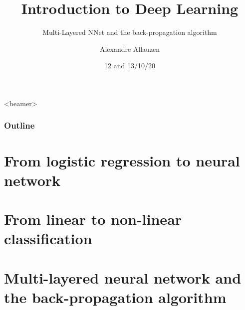 \documentclass[10pt]{beamer}
\title[IDL@BME-BIN] %
{Introduction to Deep Learning}
\subtitle{Multi-Layered NNet and the back-propagation algorithm}
\author[A. Allauzen] %
{Alexandre Allauzen}
\institute[ESPCI/Dauphine/PSL] %
{
\texttt{[image: ../logos/espci\_blue.png]}\hfill
\raisebox{1.75ex}{\texttt{[image: ../logos/dauphine.png]}}\\
\hfill\texttt{[image: ../logos/logomiles\_white.pdf]}
}
\date{12 and 13/10/20} %
\begin{document}

\begin{frame}
  \titlepage
\end{frame}

\begin{frame}<beamer>
  \frametitle{Outline}
  \tableofcontents
\end{frame}
 


\section{From logistic regression to neural network}





\section{From linear to non-linear classification}



\section{Multi-layered neural network and the back-propagation algorithm}

\end{document}
